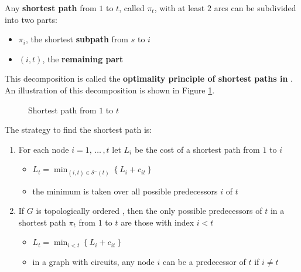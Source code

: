 \documentclass[english]{article}
\begin{document}
Any \textbf{shortest path} from \(1\) to \(t\), called \(\pi_t\), with at least \(2\) arcs can be subdivided into two parts:

\begin{itemize}
  \item \(\pi_i\), the shortest \textbf{subpath} from \(s\) to \(i\)
  \item \(\left( i, t \right)\), the \textbf{remaining part}
\end{itemize}

This decomposition is called the \textbf{optimality principle of shortest paths in \DAGs}.
An illustration of this decomposition is shown in Figure \ref{fig:shortest-path-in-DAG}.

\begin{figure}[htbp]
  \centering
  \bigskip
  \caption{Shortest path from \(1\) to \(t\)}
  \label{fig:shortest-path-in-DAG}
  \bigskip
\end{figure}

\bigskip
The strategy to find the shortest path is:

\begin{enumerate}
  \item For each node \(i = 1, \, \ldots \,, t\) let \(L_i\) be the cost of a shortest path from \(1\) to \(i\)
        \begin{itemize}[label=\(\rightarrow\)]
          \item \(L_t = \displaystyle \min_{(i, t) \in \delta^-(t)} \left\{ L_i + c_{it} \right\}\)
          \item the minimum is taken over all possible predecessors \(i\) of \(t\)
        \end{itemize}
  \item If \(G\) is topologically ordered \DAG, then the only possible predecessors of \(t\) in a shortest path \(\pi_t\) from \(1\) to \(t\) are those with index \(i < t\)
        \begin{itemize}[label=\(\rightarrow\)]
          \item \(L_t = \displaystyle \min_{i < t} \left\{ L_i + c_{it} \right\}\)
          \item in a graph with circuits, any node \(i\) can be a predecessor of \(t\) if \(i \neq t\)
        \end{itemize}
\end{enumerate}
\end{document}
